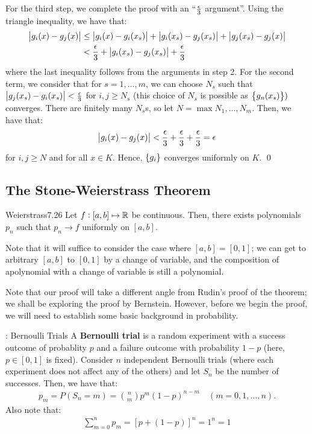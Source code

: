 \begin{nproof}
\begin{enumerate}
        For the third step, we complete the proof with an ``$\frac{\epsilon}{3}$ argument''. Using the triangle inequality, we have that:
        \begin{align*}
            \abs{g_i(x) - g_j(x)} &\leq \abs{g_i(x) - g_i(x_s)} + \abs{g_i(x_s) - g_j(x_s)} + \abs{g_j(x_s) - g_j(x)}
            \\ &< \frac{\epsilon}{3} + \abs{g_i(x_s) - g_j(x_s)} + \frac{\epsilon}{3}
        \end{align*}
        where the last inequality follows from the arguments in step 2. For the second term, we consider that for $s = 1, \ldots, m$, we can choose $N_s$ such that $\abs{g_j(x_s) - g_i(x_s)} < \frac{\epsilon}{3}$ for $i, j \geq N_s$ (this choice of $N_s$ is possible as $\set{g_n(x_s)})$ converges. There are finitely many $N_s$s, so let $N = \max{N_1, \ldots, N_m}$. Then, we have that:
        \begin{align*}
            \abs{g_i(x) - g_j(x)} < \frac{\epsilon}{3} + \frac{\epsilon}{3} + \frac{\epsilon}{3} = \epsilon    
        \end{align*}
        for $i, j \geq N$ and for all $x \in K$. Hence, $\set{g_i}$ converges uniformly on $K$. \qed
    \end{enumerate}
\end{nproof}

\subsection{The Stone-Weierstrass Theorem}

\begin{theorem}{Weierstrass}{7.26}
    Let $f: [a, b] \mapsto \mathbb{R}$ be continuous. Then, there exists polynomials $p_n$ such that $p_n \rightarrow f$ uniformly on $[a, b]$.
\end{theorem}
\noindent Note that it will suffice to consider the case where $[a, b] = [0, 1]$; we can get to arbitrary $[a, b]$ to $[0, 1]$ by a change of variable, and the composition of apolynomial with a change of variable is still a polynomial.

\noindent Note that our proof will take a different angle from Rudin's proof of the theorem; we shall be exploring the proof by Bernstein. However, before we begin the proof, we will need to establish some basic background in probability.

\begin{ndef}{: Bernoulli Trials}{}
    A \textbf{Bernoulli trial} is a random experiment with a success outcome of probablity $p$ and a failure outcome with probability $1 - p$ (here, $p \in [0, 1]$ is fixed). Consider $n$ independent Bernoulli trials (where each experiment does not affect any of the others) and let $S_n$ be the number of successes. Then, we have that:
    \begin{align*}
        p_m = P(S_n = m) = \binom{n}{m}p^m(1-p)^{n-m} \quad (m = 0, 1, \ldots, n).
    \end{align*}
    Also note that:
    \begin{align*}
        \sum_{m=0}^np_m = [p+(1-p)]^n = 1^n = 1
    \end{align*}
\end{ndef}


